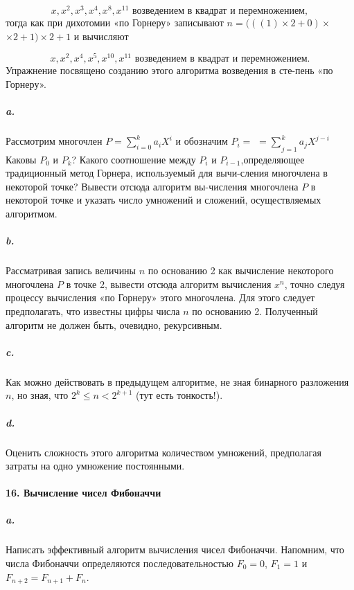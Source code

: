 \documentclass{mai_book}
\begin{document}
\begin{equation*}
x, x^{2},x^{3},x^{4},x^{8},x^{11} \text{ возведением в квадрат и перемножением},
\end{equation*}
тогда как при дихотомии «по Горнеру» записывают $n= (\left({\left({1}\right)\times{2}+0}\right)\times$\linebreak
$\times{2}+1)\times{2}+1$ и вычисляют 

\begin{equation*}
x, x^{2},x^{4},x^{5},x^{10},x^{11} \text{ возведением в квадрат и перемножением}.
\end{equation*}
Упражнение посвящено созданию этого алгоритма возведения в сте-\linebreak пень «по Горнеру».


\subparagraph { a.} Рассмотрим многочлен $P=\sum_{i=0}^k a_{i}X^{i}$ и обозначим $ P_{i}=$\linebreak
$={\sum_{}^{}}_{j=1}^k a_{j}X^{j-i}$ Каковы $P_{0}$ и $P_{k}$? Какого соотношение между $P_{i}$ и $P_{i-1}$,\linebreak определяющее традиционный метод Горнера, используемый для вычи-\linebreak сления многочлена в некоторой точке? Вывести отсюда алгоритм вы-\linebreak числения многочлена $P$ в некоторой точке и указать число умножений и сложений, осуществляемых алгоритмом. 

\subparagraph { b.} Рассматривая запись величины $n$ по основанию 2 как вычисление некоторого многочлена $P$ в точке 2, вывести отсюда алгоритм вычисления $x^{n}$, точно следуя процессу вычисления «по Горнеру» этого многочлена. Для этого следует предполагать, что известны цифры числа $n$ по основанию 2. Полученный алгоритм не должен быть, очевидно, рекурсивным. 

\subparagraph { c.} Как можно действовать в предыдущем алгоритме, не зная бинарного разложения $n$, но зная, что $2^{k}\leq{n}<2^{k+1}$ (тут есть тонкость!).

\subparagraph { d.} Оценить сложность этого алгоритма количеством умножений, предполагая затраты на одно умножение постоянными. 

\paragraph { 16. Вычисление чисел Фибоначчи }

\subparagraph { a.} Написать эффективный алгоритм вычисления чисел Фибоначчи. Напомним, что числа Фибоначчи определяются последовательностью $F_{0}=0$, $F_{1}=1$ и $F_{n+2}=F_{n+1}+F_{n}$.
\end{document}
